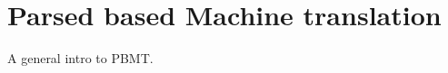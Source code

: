 \documentclass[../thesis.tex]{subfiles}
\begin{document}
\chapter{Parsed based Machine translation}
\label{chap:pbmt}
A general intro to PBMT.
\end{document}
